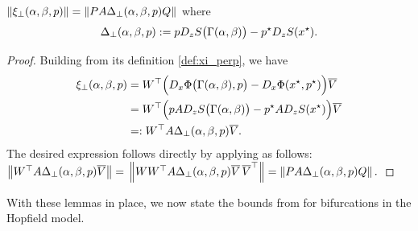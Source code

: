 \documentclass[letterpaper, 10 pt, conference]{ieeeconf}
\begin{document}
\vspace{3mm}

\begin{lemma}\label{lem:hopfield-xi_perp}
    \(\left\lVert{\ensuremath{\xi_{\perp}(\alpha,\beta,p)}}\right\rVert = \left\lVert{P A \Delta_{\perp}(\alpha,\beta,p) Q}\right\rVert\) where
    \vspace{0mm} \begin{equation}
        \Delta_{\perp}(\alpha, \beta, p) := p D_{z}S\bigl(\Gamma(\alpha,\beta)\bigr) - p^{\star} D_{z}S(x^{\star}). \label{eq:hopfield-xi_perp_terms}
        \vspace{2mm} \end{equation}
\end{lemma}
\begin{proof}
    Building from its definition \eqref{def:xi_perp}, we have
    \begin{align*}
        \xi_{\perp}(\alpha,\beta,p) & = W^{\top}\Bigl(D_{x}\Phi\bigl(\Gamma(\alpha,\beta),p\bigr)-D_{x}\Phi(x^{\star},p^{\star})\Bigr)\overline{V} \\
                 & = W^{\top}\Bigl(p A D_{z}S\bigl(\Gamma(\alpha,\beta)\bigr) - p^{\star} A D_{z}S(x^{\star})\Bigr)\overline{V} \\
                 & =: W^{\top} A \Delta_{\perp}(\alpha, \beta, p) \overline{V}.
    \end{align*}
    The desired expression follows directly by applying  as follows:
    \(
    \left\lVert{W^{\top} A \Delta_{\perp}(\alpha, \beta, p) \ensuremath{\overline{V}}}\right\rVert = \\
    \left\lVert{WW^{\top} A \Delta_{\perp}(\alpha, \beta, p) \ensuremath{\overline{V}}\,\ensuremath{\overline{V}}^{\top}}\right\rVert = \left\lVert{P A \Delta_{\perp}(\alpha, \beta, p) Q}\right\rVert.
    \)
\end{proof}

\vspace{2mm}

With these lemmas in place, we now state the bounds from  for bifurcations in the Hopfield model.

\vspace{3mm}
\end{document}
